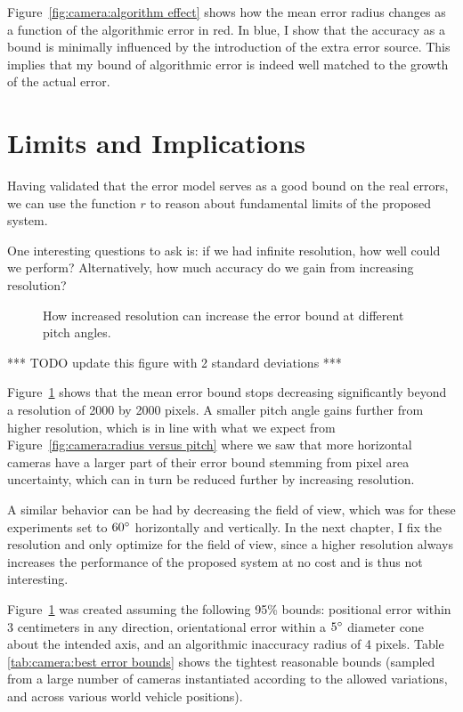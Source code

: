 \documentclass[a4paper,12pt,twoside,openright]{report}
\begin{document}
Figure~\ref{fig:camera:algorithm effect} shows how the mean error radius changes as a function of the 
algorithmic error in red. In blue, I show that the accuracy as a bound is minimally influenced 
by the introduction of the extra error source. This implies that my bound of
algorithmic error is indeed well matched to the growth of the actual error.


\section{Limits and Implications}
\label{sec:camera:implications}

Having validated that the error model serves as a good bound on the real errors, we can use the function $r$
to reason about fundamental limits of the proposed system.

One interesting questions to ask is: if we had infinite resolution,
how well could we perform? Alternatively, how much accuracy do we gain from increasing resolution?

\begin{figure}[htb]
    \begin{center}
        
    \end{center}
    \caption[Resolution Limits]{How increased resolution can increase the error bound at different pitch angles.}
    \label{fig:camera:resolution}
\end{figure}

*** TODO update this figure with 2 standard deviations ***

Figure~\ref{fig:camera:resolution} shows that the mean error bound stops decreasing
significantly beyond a resolution of 2000 by 2000 pixels. A smaller pitch 
angle gains further from higher resolution, which is in line with what we 
expect from Figure~\ref{fig:camera:radius versus pitch} where we saw that more horizontal cameras
have a larger part of their error bound stemming from pixel area uncertainty,
which can in turn be reduced further by increasing resolution.

A similar behavior can be had by decreasing the field of view, which was for
these experiments set to $60\degree$ horizontally and vertically. 
In the next chapter, I fix the resolution and only optimize for the field of view,
since a higher resolution always increases the performance
of the proposed system at no cost and is thus not interesting.

Figure~\ref{fig:camera:resolution} was created assuming the following 95\% bounds: positional error
within 3 centimeters in any direction, orientational error within a
$5\degree$ diameter cone about the intended axis, 
and an algorithmic inaccuracy radius of 4 pixels. Table \ref{tab:camera:best error bounds}
shows the tightest reasonable bounds (sampled from
a large number of cameras instantiated according to the allowed variations,
and across various world vehicle positions). 
\end{document}
